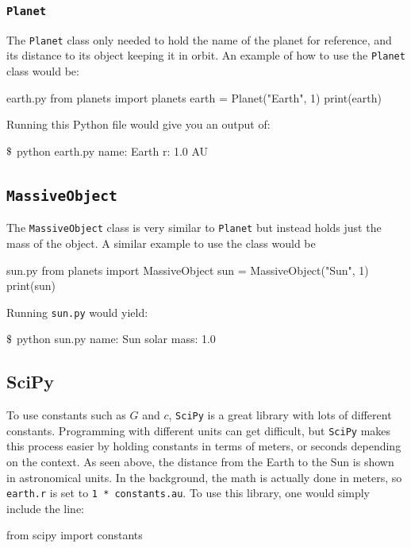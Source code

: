 \documentclass{article}
\begin{document}
\subsubsection{\texttt{Planet}}
The \texttt{Planet} class only needed to hold the name of the planet for reference, and its distance to its object keeping it
in orbit. An example of how to use the \texttt{Planet} class would be:
\begin{pylisting}{earth.py}
from planets import planets
earth = Planet("Earth", 1)
print(earth)
\end{pylisting}

\noindent Running this Python file would give you an output of:
\begin{bashlisting}{}
$\mbox{\textdollar}$ python earth.py
name: Earth     r: 1.0 AU
\end{bashlisting}

\subsection{\texttt{MassiveObject}}

The \texttt{MassiveObject} class is very similar to \texttt{Planet} but instead holds just the mass of the object. A similar 
example to use the class would be
\begin{pylisting}{sun.py}
from planets import MassiveObject
sun = MassiveObject("Sun", 1)
print(sun)
\end{pylisting}
Running \texttt{sun.py} would yield:
\begin{bashlisting}{}
$\mbox{\textdollar}$ python sun.py
name: Sun       solar mass: 1.0
\end{bashlisting}

\subsection{SciPy}

To use constants such as $G$ and $c$, \texttt{SciPy} is a great library with lots of different constants. Programming with
different units can get difficult, but \texttt{SciPy} makes this process easier by holding constants in terms of meters,
or seconds depending on the context. As seen above, the distance from the Earth to the Sun is shown in astronomical units.
In the background, the math is actually done in meters, so \texttt{earth.r} is set to \texttt{1 * constants.au}. To use this
library, one would simply include the line:
\begin{pylisting}{}
from scipy import constants
\end{pylisting}
\end{document}

